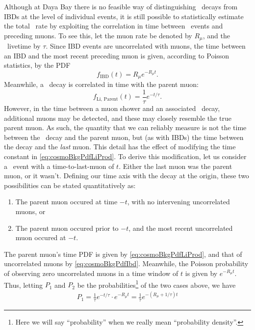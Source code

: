 \documentclass[../thesis.tex]{subfiles}
\begin{document}
Although at Daya Bay there is no feasible way of distinguishing \linine\ decays from IBDs at the level of individual events, it is still possible to statistically estimate the total \linine\ rate by exploiting the correlation in time between \linine\ events and preceding muons. To see this, let the muon rate be denoted by $R_\mu$, and the \linine\ livetime by $\tau$. Since IBD events are uncorrelated with muons, the time between an IBD and the most recent preceding muon is given, according to Poisson statistics, by the PDF
\begin{equation}
  \label{eq:cosmoBkgPdfIbd}
  f_{\mathrm{IBD}}(t) = R_\mu e^{-R_\mu t}.
\end{equation}
Meanwhile, a \linine\ decay is correlated in time with the parent muon:
\begin{equation}
  \label{eq:cosmoBkgPdfLiProd}
  f_{\mathrm{Li,\,Parent}}(t) = \frac{1}{\tau} e^{-t/\tau}.
\end{equation}
However, in the time between a muon shower and an associated \linine\ decay, additional muons may be detected, and these may closely resemble the true parent muon. As such, the quantity that we can reliably measure is not the time between the \linine\ decay and the parent muon, but (as with IBDs) the time between the decay and the \emph{last} muon. This detail has the effect of modifying the time constant in \autoref{eq:cosmoBkgPdfLiProd}. To derive this modification, let us consider a \linine\ event with a time-to-last-muon of $t$. Either the last muon was the parent muon, or it wasn't. Defining our time axis with the decay at the origin, these two possibilities can be stated quantitatively as:
\begin{enumerate}
\item The parent muon occured at time $-t$, with no intervening uncorrelated muons, or
\item The parent muon occured prior to $-t$, and the most recent uncorrelated muon occured at $-t$.
\end{enumerate}
The parent muon's time PDF is given by \autoref{eq:cosmoBkgPdfLiProd}, and that of uncorrelated muons by \autoref{eq:cosmoBkgPdfIbd}. Meanwhile, the Poisson probability of observing zero uncorrelated muons in a time window of $t$ is given by $e^{-R_\mu t}$. Thus, letting $P_1$ and $P_2$ be the probabilities\footnote{Here we will say ``probability'' when we really mean ``probability density''.} of the two cases above, we have
\begin{align*}
  P_1 = \frac{1}{\tau} e^{-t/\tau} \cdot e^{-R_\mu t} = \frac{1}{\tau}e^{-(R_\mu + 1/\tau)t}
\end{align*}
\end{document}

